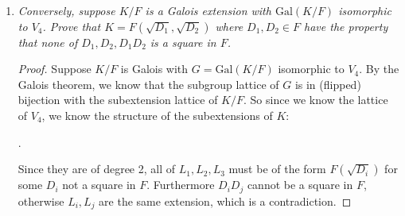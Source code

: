 \documentclass[9pt,reqno,twoside]{amsbook}
\theoremstyle{plain}
\numberwithin{section}{chapter}
\numberwithin{equation}{chapter}
\theoremstyle{definition}
\theoremstyle{remark}
\theoremstyle{plain}
\newcommand{\z}{\mathbb{Z}}
\newcommand{\bb}{\vspace{3mm}}
\newcommand{\bee}{\begin{equation}\begin{aligned}}
\newcommand{\eee}{\end{aligned}\end{equation}}
\newcommand{\gal}{\mathrm{Gal}}
\newcommand{\qwe}{\sqrt}
\renewcommand{\phi}{\varphi}
\begin{document}
\begin{enumerate}[label=\arabic*.]
\begin{enumerate}
\begin{proof}
Since $D_1,D_2$ are not squares, we know $F(\qwe{D_1})/F$ and $F(\qwe{D_2})/F$ are both extensions of degree 2. And since $D_1D_2$ is not a square, we know that $F(\qwe{D_2})/F(\qwe{D_1})$ is a nontrivial extension (has degree 2). Thus we know that $K/F$ has degree 4.  We wish to first show it is Galois. Let $\alpha = \qwe{D_1},\beta = \qwe{D_2}$. Then $m_{\alpha,F} = x^2 - D_1,m_{\beta,F} = x^2 - D_2$. And since the roots of these are $\pm\alpha,\pm \beta$, we know they are both separable, so $\alpha,\beta$ are separable, so $K/F$ is separable. Also, $K$ is normal since the only conjugates of $\alpha,\beta$ are $-\alpha,-\beta$, so $K/F$ is normal and separable, thus it is Galois. We enumerate the automorphisms of $K$ in the Galois group $G$. We have choices of mappings:
\bee
\alpha &\mapsto \alpha,-\alpha\\
\beta &\mapsto \beta,-\beta.
\eee
So we have:
\bee
1&:\alpha \mapsto \alpha, && \beta \mapsto \beta\\
\phi_1&:\alpha \mapsto -\alpha, && \beta \mapsto \beta\\
\phi_2&:\alpha \mapsto \alpha,  && \beta \mapsto -\beta\\
\phi_3&: \alpha \mapsto -\alpha,  && \beta \mapsto -\beta.
\eee
Clearly, each has order 2, so it is $V_4$. 
\end{proof}
\bb

\item \textit{Conversely, suppose $K/F$ is a Galois extension with $\gal(K/F)$ isomorphic to $V_4$. Prove that $K = F(\qwe{D_1},\qwe{D_2})$ where $D_1,D_2 \in F$ have the property that none of $D_1,D_2,D_1D_2$ is a square in $F$. }

\begin{proof}
Suppose $K/F$ is Galois with $G = \gal(K/F)$ isomorphic to $V_4$. By the Galois theorem, we know that the subgroup lattice of $G$ is in (flipped) bijection with the subextension lattice of $K/F$. So since we know the lattice of $V_4$, we know the structure of the subextensions of $K$:
\begin{center}
.
\end{center}
Since they are of degree 2, all of $L_1,L_2,L_3$ must be of the form $F(\qwe{D_i})$ for some $D_i$ not a square in $F$. Furthermore $D_iD_j$ cannot be a square in $F$, otherwise $L_i,L_j$ are the same extension, which is a contradiction. 
\end{proof}
\end{enumerate}




\end{enumerate}
\end{document}
